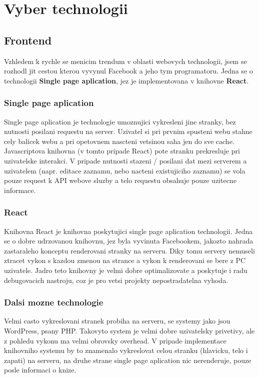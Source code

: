 \chapter{Vyber technologii}


\section{Frontend}
Vzhledem k rychle se menicim trendum v oblasti webovych technologii,
jsem se rozhodl jit cestou kterou vyvynul Facebook a jeho tym programatoru.
Jedna se o technologii \textbf{Single page aplication},
jez je implementovana v knihovne \textbf{React}.

\subsection{Single page aplication}
Single page aplication je technologie umoznujici vykresleni jine stranky,
bez nutnosti posilani requestu na server.
Uzivatel si pri prvnim spusteni webu stahne cely balicek webu a 
pri opetovnem nascteni vetsinou saha jen do sve cache.
Javascriptova knihovna (v tomto pripade React)
pote stranku prekresluje pri uzivatelske interakci.
V pripade nutnosti stazeni / posilani dat mezi serverem a uzivatelem
(napr. editace zaznamu, nebo nacteni existujiciho zaznamu)
se vola pouze request k API webove sluzby a telo requestu obsahuje pouze
uzitecne informace. 


\subsection{React}
Knihovna React je knihovna poskytujici single page aplication technologii.
Jedna se o dobre udrzovanou knihovnu, jez byla vyvinuta Facebookem, 
jakozto nahrada zastaraleho konceptu renderovani stranky na serveru.
Diky tomu servery nemuseli ztracet vykon s kazdou zmenou na strance a
vykon k renderovani se bere z PC uzivatele.
Jadro teto knihovny je velmi dobre optimalizovate a poskytuje i radu
debugovacich nastroju, coz je pro vetsi projekty nepostradatelna vyhoda.  


\subsection{Dalsi mozne technologie}
Velmi casto vykreslovani stranek probiha na serveru, se systemy jako jsou 
WordPress, psany PHP. Takovyto system je velmi dobre uzivatelsky privetivy,
ale z pohledu vykonu ma velmi obrovsky overhead. 
V pripade implementace knihovniho systemu by to znamenalo vykreslovat
celou stranku (hlavicku, telo i zapati) na serveru,
na druhe strane single page aplication nic nerenderuje,
pouze posle informaci o knize.


